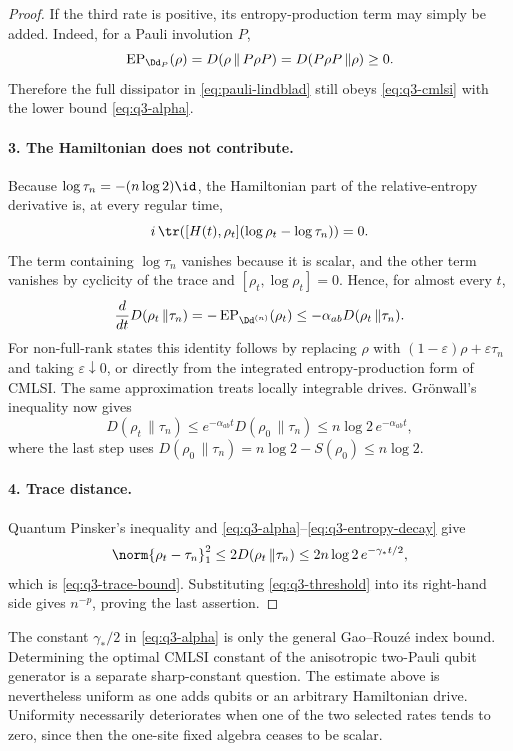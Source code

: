 \documentclass[class=article,11pt,a4paper,crop=false]{standalone}
\begin{document}
\begin{proof}
If the third rate is positive, its entropy-production term may simply be
added. Indeed, for a Pauli involution $P$,
\[
 \operatorname{EP}_{\Dd_P}(\rho)
 =D(\rho\,\|\,P\rho P)=D(P\rho P\,\| \rho)\ge0.
\]
Therefore the full dissipator in \eqref{eq:pauli-lindblad} still obeys
\eqref{eq:q3-cmlsi} with the lower bound \eqref{eq:q3-alpha}.

\paragraph{3. The Hamiltonian does not contribute.}
Because $\log\tau_n=-(n\log2)\id$, the Hamiltonian part of the relative-entropy
derivative is, at every regular time,
\[
 i\,\tr\!\left([H(t),\rho_t]
       (\log\rho_t-\log\tau_n)\right)=0.
\]
The term containing $\log\tau_n$ vanishes because it is scalar, and the other
term vanishes by cyclicity of the trace and
$[\rho_t,\log\rho_t]=0$. Hence, for almost every $t$,
\begin{equation}\label{eq:q3-differential}
 \frac{d}{dt}D(\rho_t\,\| \tau_n)
 =-\operatorname{EP}_{\Dd^{(n)}}(\rho_t)
 \le-\alpha_{ab}D(\rho_t\,\| \tau_n).
\end{equation}
For non-full-rank states this identity follows by replacing $\rho$ with
$(1-\varepsilon)\rho+\varepsilon\tau_n$ and taking
$\varepsilon\downarrow0$, or directly from the integrated entropy-production
form of CMLSI. The same approximation treats locally integrable drives.
Gr\"onwall's inequality now gives
\begin{equation}\label{eq:q3-entropy-decay}
 D(\rho_t\,\| \tau_n)
 \le e^{-\alpha_{ab}t}D(\rho_0\,\| \tau_n)
 \le n\log2\,e^{-\alpha_{ab}t},
\end{equation}
where the last step uses
$D(\rho_0\,\| \tau_n)=n\log2-S(\rho_0)\le n\log2$.

\paragraph{4. Trace distance.}
Quantum Pinsker's inequality and \eqref{eq:q3-alpha}--\eqref{eq:q3-entropy-decay}
give
\[
 \norm{\rho_t-\tau_n}_1^2
 \le2D(\rho_t\,\| \tau_n)
 \le2n\log2\,e^{-\gamma_*t/2},
\]
which is \eqref{eq:q3-trace-bound}. Substituting
\eqref{eq:q3-threshold} into its right-hand side gives $n^{-p}$, proving the
last assertion.
\end{proof}

\begin{remark}\label{rem:q3-constants}
The constant $\gamma_*/2$ in \eqref{eq:q3-alpha} is only the general
Gao--Rouz\'e index bound. Determining the optimal CMLSI constant of the
anisotropic two-Pauli qubit generator is a separate sharp-constant question.
The estimate above is nevertheless uniform as one adds qubits or an arbitrary
Hamiltonian drive. Uniformity necessarily deteriorates when one of the two
selected rates tends to zero, since then the one-site fixed algebra ceases to
be scalar.
\end{remark}
\end{document}
